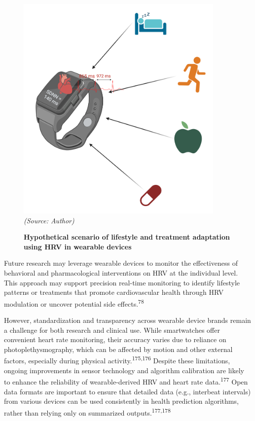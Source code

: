 \documentclass[
  a4paper,
  headsepline=true,
  open=left]{scrbook}
\begin{document}
\begin{figure}

{\centering 

\includegraphics[width=4in,height=\textheight]{images/smartwatch.png}
\emph{(Source: Author)}

}

\caption{\label{fig-smw}\textbf{Hypothetical scenario of lifestyle and
treatment adaptation using HRV in wearable devices}}

\end{figure}

Future research may leverage wearable devices to monitor the
effectiveness of behavioral and pharmacological interventions on HRV at
the individual level. This approach may support precision real-time
monitoring to identify lifestyle patterns or treatments that promote
cardiovascular health through HRV modulation or uncover potential side
effects.\textsuperscript{78}

However, standardization and transparency across wearable device brands
remain a challenge for both research and clinical use. While
smartwatches offer convenient heart rate monitoring, their accuracy
varies due to reliance on photoplethysmography, which can be affected by
motion and other external factors, especially during physical
activity.\textsuperscript{175,176} Despite these limitations, ongoing
improvements in sensor technology and algorithm calibration are likely
to enhance the reliability of wearable-derived HRV and heart rate
data.\textsuperscript{177} Open data formats are important to ensure
that detailed data (e.g., interbeat intervals) from various devices can
be used consistently in health prediction algorithms, rather than
relying only on summarized outputs.\textsuperscript{177,178}
\end{document}
